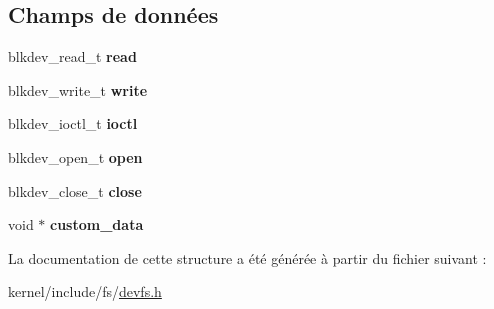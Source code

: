 \subsection*{Champs de données}
\begin{DoxyCompactItemize}
\item 
\hypertarget{structblkdev__interfaces_ad14a2ad714105cdb8ce002eb4fb9e747}{blkdev\-\_\-read\-\_\-t {\bfseries read}}\label{structblkdev__interfaces_ad14a2ad714105cdb8ce002eb4fb9e747}

\item 
\hypertarget{structblkdev__interfaces_ae99fb7e1529ef6c24df9dc454bc0f9f6}{blkdev\-\_\-write\-\_\-t {\bfseries write}}\label{structblkdev__interfaces_ae99fb7e1529ef6c24df9dc454bc0f9f6}

\item 
\hypertarget{structblkdev__interfaces_ae93720624e6f1a1ea33e31bf1da4c097}{blkdev\-\_\-ioctl\-\_\-t {\bfseries ioctl}}\label{structblkdev__interfaces_ae93720624e6f1a1ea33e31bf1da4c097}

\item 
\hypertarget{structblkdev__interfaces_a08eaa39b105826d2780991b32577867a}{blkdev\-\_\-open\-\_\-t {\bfseries open}}\label{structblkdev__interfaces_a08eaa39b105826d2780991b32577867a}

\item 
\hypertarget{structblkdev__interfaces_ab7623005e31211894853b3524e1e74eb}{blkdev\-\_\-close\-\_\-t {\bfseries close}}\label{structblkdev__interfaces_ab7623005e31211894853b3524e1e74eb}

\item 
\hypertarget{structblkdev__interfaces_a8eea79e70042c41cc171796b501a9fd1}{void $\ast$ {\bfseries custom\-\_\-data}}\label{structblkdev__interfaces_a8eea79e70042c41cc171796b501a9fd1}

\end{DoxyCompactItemize}


La documentation de cette structure a été générée à partir du fichier suivant \-:\begin{DoxyCompactItemize}
\item 
kernel/include/fs/\hyperlink{devfs_8h}{devfs.\-h}\end{DoxyCompactItemize}
